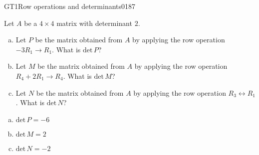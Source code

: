 \begin{exercise}{GT1}{Row operations and determinants}{0187} 
\begin{exerciseStatement} 

Let \(A\) be a \(4 \times 4\) matrix with determinant \(2\).

 

\begin{enumerate}[(a)]
\item Let \(P\) be the matrix obtained from \(A\) by applying the row operation \(-3 R_1 \to R_1\). What is \(\mathrm{det}\,P\)?
\item Let \(M\) be the matrix obtained from \(A\) by applying the row operation \(R_4 + 2 R_1 \to R_4\). What is \(\mathrm{det}\,M\)?
\item Let \(N\) be the matrix obtained from \(A\) by applying the row operation \(R_3 \leftrightarrow R_1\). What is \(\mathrm{det}\,N\)?
\end{enumerate}

     \end{exerciseStatement}
 \begin{exerciseAnswer} 

\begin{enumerate}[(a)]
\item \(\mathrm{det}\,P=-6\)
\item \(\mathrm{det}\,M=2\)
\item \(\mathrm{det}\,N=-2\)
\end{enumerate}

     \end{exerciseAnswer}
 \end{exercise}



